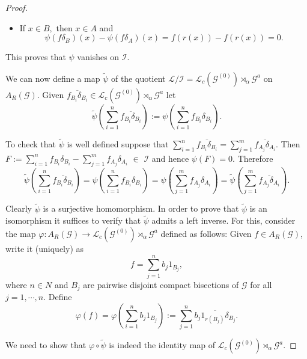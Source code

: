 \documentclass[11pt, a4paper]{amsart}
\newcommand{\G}{\ensuremath {\mathcal{G}}}
\newcommand{\Go}{\ensuremath {\mathcal{G}^{(0)}}}
\newcommand{\Ga}{\ensuremath {\mathcal{G}^{a}}}
\newcommand{\Lgo}{\ensuremath {\mathcal{L}_c(\Go)\rtimes_{\alpha} \Ga}}
\theoremstyle{plain}
\begin{document}
\begin{proof}
\begin{itemize}
\item If $x \in B,$ then  $x \in A$ and $$ \psi(f\delta_B)(x)-\psi(f\delta_A)(x)=f(r(x))-f(r(x))=0.$$
\end{itemize}
This proves that $\psi$ vanishes on $\mathcal{I}$.

We can now define a map $\tilde{\psi}$ of the quotient $\mathcal{L}/\mathcal{I}=\Lgo$ on $A_R(\G).$ Given $\overline{f_{B_i} \delta_{B_i}} \in \Lgo$ let
  $$ \tilde{\psi}\left(\sum_{i=1}^{n}\overline{f_{B_i} \delta_{B_i}}\right):= \psi\left(\sum_{i=1}^n f_{B_i}\delta_{B_i}\right).$$

To check that $\tilde{\psi}$ is well defined suppose that $ \sum_{i=1}^n \overline{f_{B_i}\delta_{B_i}}= \sum_{j=1}^m \overline{f_{A_j}\delta_{A_i}}.$ Then $ F:= \sum_{i=1}^n f_{B_i}\delta_{B_i}- \sum_{j=1}^m f_{A_j}\delta_{A_i} \,\, \in \,\, \mathcal{I}$ and hence $\psi(F)=0.$ Therefore
$$\tilde{\psi} \left(\sum_{i=1}^n \overline{f_{B_i}\delta_{B_i}}\right)= \psi\left(\sum_{i=1}^n f_{B_i}\delta_{B_i}\right)= \psi\left(\sum_{j=1}^m f_{A_j}\delta_{A_i}\right)= \tilde{\psi}\left(\sum_{j=1}^m \overline{f_{A_j}\delta_{A_i}}\right).$$

Clearly $\tilde{\psi}$ is a surjective homomorphism. In order to prove that $\tilde{\psi}$ is an isomorphism it suffices to verify that $\tilde{\psi}$ admits a left inverse. For this, consider the map $\varphi : A_R(\G) \rightarrow \Lgo$ defined as follows: Given $f \in A_R(\G)$, write it (uniquely) as
  $$f = \sum_{j=1}^n b_j 1_{B_j},$$ 
where $n \in N$ and $B_j$ are pairwise disjoint compact bisections of $\G$ for all $j=1, \cdots, n.$ Define 
  $$\varphi(f) = \varphi\left(\sum_{i=1}^n b_j 1_{B_j}\right) :=\sum_{j=1}^n \overline{b_j 1_{r(B_j)}\delta_{B_j}}. $$

We need to show that $\varphi \circ \tilde{\psi}$ is indeed the identity map of $\Lgo.$ 


\end{proof}
\end{document}
